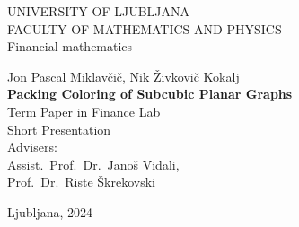 \documentclass[12pt,a4paper]{amsart}
\theoremstyle{definition}
\theoremstyle{plain}
\newcommand{\program}{Financial mathematics}
\newcommand{\imeavtorja}{Jon Pascal Miklavčič, Nik Živkovič Kokalj}
\newcommand{\imementorja}{Assist.~Prof.~Dr.~Janoš Vidali}
\newcommand{\imesomentorja}{Prof.~Dr.~Riste Škrekovski}
\newcommand{\naslovdela}{Packing Coloring of Subcubic Planar Graphs}
\newcommand{\letnica}{2024}
\begin{document}
\thispagestyle{empty}
{\large
\noindent UNIVERSITY OF LJUBLJANA\\[1mm]
FACULTY OF MATHEMATICS AND PHYSICS\\[5mm]
\program\ }
\vfill

\begin{center}{\large
\imeavtorja\\[2mm]
{\bf \Large \naslovdela}\\[10mm]
{\normalsize Term Paper in Finance Lab}\\[1mm]
{\normalsize Short Presentation}\\[1cm]
{\normalsize Advisers:}\\
{\normalsize \imementorja, \\ \imesomentorja}\\[2mm]}
\end{center}
\vfill

{\large Ljubljana, \letnica}
\pagebreak
\end{document}
